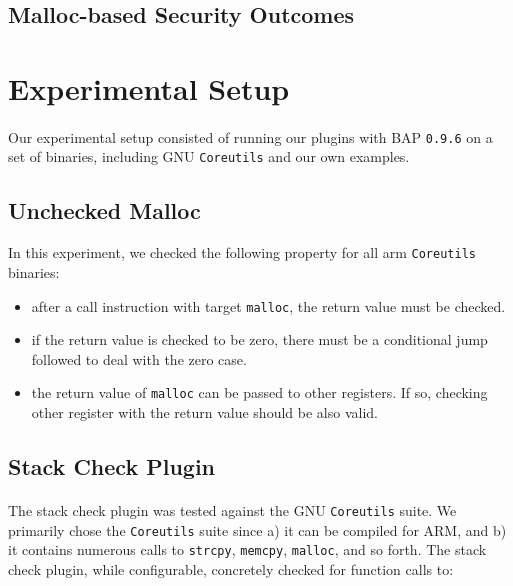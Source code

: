 \documentclass[letterpaper,11pt]{article}
\begin{document}
\subsection{Malloc-based Security Outcomes}




\section{Experimental Setup}

\paragraph{}
Our experimental setup consisted of running our plugins with BAP \texttt{0.9.6}
\cite{bap} on a set of binaries, including GNU \texttt{Coreutils} and our
own examples.

\subsection{Unchecked Malloc}

In this experiment, we checked the following property for all arm
\texttt{Coreutils} binaries:
\begin{itemize}
\item after a call instruction with target \texttt{malloc}, the return value
    must be checked.
\item if the return value is checked to be zero, there must be a conditional
    jump followed to deal with the zero case.
\item the return value of \texttt{malloc} can be passed to other registers. If
    so, checking other register with the return value should be also valid.
\end{itemize}

\subsection{Stack Check Plugin}

\paragraph{}
The stack check plugin was tested against the GNU \texttt{Coreutils} suite. We
primarily chose the \texttt{Coreutils} suite since a) it can be compiled for
ARM, and b) it contains numerous calls to \texttt{strcpy}, \texttt{memcpy},
\texttt{malloc}, and so forth.  The stack check plugin, while configurable,
concretely checked for function calls to:
\end{document}
